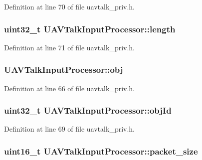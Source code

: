\-Definition at line 70 of file uavtalk\-\_\-priv.\-h.

\hypertarget{struct_u_a_v_talk_input_processor_aed838e1ff0464bc7a7a2c83d699cbb26}{
\subsubsection[{length}]{\setlength{\rightskip}{0pt plus 5cm}uint32\-\_\-t {\bf \-U\-A\-V\-Talk\-Input\-Processor\-::length}}}\label{struct_u_a_v_talk_input_processor_aed838e1ff0464bc7a7a2c83d699cbb26}


\-Definition at line 71 of file uavtalk\-\_\-priv.\-h.

\hypertarget{struct_u_a_v_talk_input_processor_a78153a61f3d6bd1097e51b65f176c341}{
\subsubsection[{obj}]{ {\bf \-U\-A\-V\-Talk\-Input\-Processor\-::obj}}}\label{struct_u_a_v_talk_input_processor_a78153a61f3d6bd1097e51b65f176c341}


\-Definition at line 66 of file uavtalk\-\_\-priv.\-h.

\hypertarget{struct_u_a_v_talk_input_processor_a02e62fc516bd524be74fd36898116d52}{
\subsubsection[{obj\-Id}]{\setlength{\rightskip}{0pt plus 5cm}uint32\-\_\-t {\bf \-U\-A\-V\-Talk\-Input\-Processor\-::obj\-Id}}}\label{struct_u_a_v_talk_input_processor_a02e62fc516bd524be74fd36898116d52}


\-Definition at line 69 of file uavtalk\-\_\-priv.\-h.

\hypertarget{struct_u_a_v_talk_input_processor_a21adf6a8fc9bfc307b883a7b8ff412d1}{
\subsubsection[{packet\-\_\-size}]{\setlength{\rightskip}{0pt plus 5cm}uint16\-\_\-t {\bf \-U\-A\-V\-Talk\-Input\-Processor\-::packet\-\_\-size}}}\label{struct_u_a_v_talk_input_processor_a21adf6a8fc9bfc307b883a7b8ff412d1}


